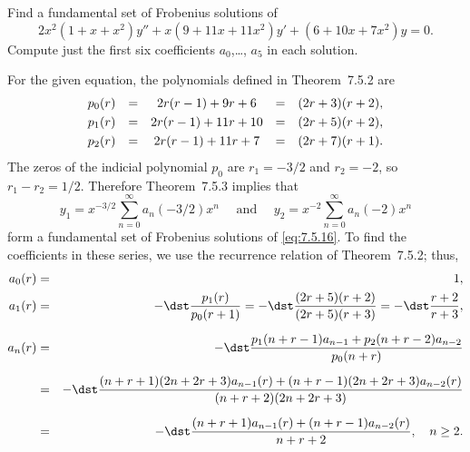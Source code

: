 \setcounter{example}{0}
\setcounter{equation}{15}
\begin{example}
  \label{example:7.5.1}\rm Find a fundamental set of Frobenius solutions of
  \begin{equation}
    \label{eq:7.5.16}2x^{2}(1+x+x^{2})y''+x(9+11x+11x^{2})y'+(6+10x+7x^{2})y=0.
  \end{equation}
  Compute just the first six coefficients $a_{0}$,\dots, $a_{5}$ in each solution.
\end{example}
\setcounter{equation}{16}
\begin{examplesolution}
\solution For the given equation, the polynomials defined in Theorem~7.5.2 are
\[
  \begin{array}{ccccc}
    p_{0}(r) & = & 2r(r-1)+9r+6   & = & (2r+3)(r+2), \\[1\jot]
    p_{1}(r) & = & 2r(r-1)+11r+10 & = & (2r+5)(r+2), \\[1\jot]
    p_{2}(r) & = & 2r(r-1)+11r+7  & = & (2r+7)(r+1).
  \end{array}
\]
The zeros of the indicial polynomial $p_{0}$ are $r_{1}=-3/2$ and $r_{2}=-2$, so $r_{1}-r_{2}=1/2$.
Therefore Theorem~7.5.3 implies that
\begin{equation}
  \label{eq:7.5.17}y_{1}=x^{-3/2}\sum_{n=0}^{\infty}a_{n}(-3/2)x^{n}\quad\mbox{ and }\quad y_{2}=x^{-2}\sum_{n=0}^{\infty}a_{n}(-2)x^{n}
\end{equation}
form a fundamental set of Frobenius solutions of \eqref{eq:7.5.16}. To find the coefficients in
these series, we use the recurrence relation of Theorem~7.5.2; thus,
\begin{eqnarray*}
  a_{0}(r) & = & 1,                                                                                          \\
  a_{1}(r) & = & -\dst\frac{p_{1}(r)}{p_{0}(r+1)}=-\dst\frac{(2r+5)(r+2)}{(2r+5)(r+3)}=-\dst\frac{r+2}{r+3}, \\[2\jot]
  a_{n}(r) & = & -\dst\frac{p_{1}(n+r-1)a_{n-1}+p_{2}(n+r-2)a_{n-2}}{p_{0}(n+r)}                             \\[2\jot]
           & = & -\dst\frac{(n+r+1)(2n+2r+3)a_{n-1}(r)+(n+r-1)(2n+2r+3)a_{n-2}(r)}{(n+r+2)(2n+2r+3)}         \\[2\jot]
           & = & -\dst\frac{(n+r+1)a_{n-1}(r)+(n+r-1)a_{n-2}(r)}{n+r+2},\quad n\ge2.
\end{eqnarray*}


\end{examplesolution}
